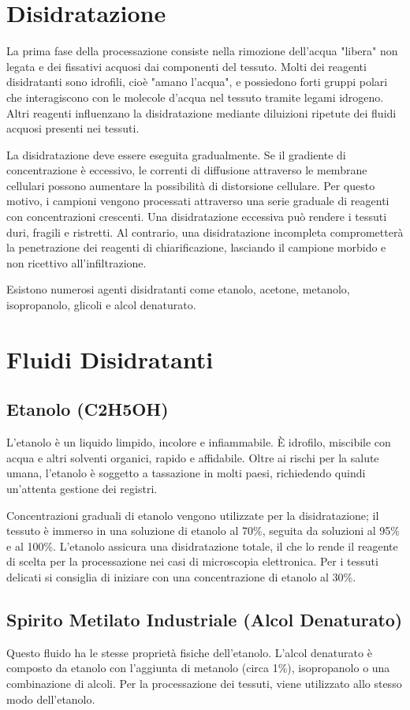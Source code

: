 \section{Disidratazione}
La prima fase della processazione consiste nella rimozione dell'acqua "libera" non legata e dei fissativi acquosi dai componenti del tessuto. Molti dei reagenti disidratanti sono idrofili, cioè "amano l'acqua", e possiedono forti gruppi polari che interagiscono con le molecole d'acqua nel tessuto tramite legami idrogeno. Altri reagenti influenzano la disidratazione mediante diluizioni ripetute dei fluidi acquosi presenti nei tessuti.

La disidratazione deve essere eseguita gradualmente. Se il gradiente di concentrazione è eccessivo, le correnti di diffusione attraverso le membrane cellulari possono aumentare la possibilità di distorsione cellulare. Per questo motivo, i campioni vengono processati attraverso una serie graduale di reagenti con concentrazioni crescenti. Una disidratazione eccessiva può rendere i tessuti duri, fragili e ristretti. Al contrario, una disidratazione incompleta comprometterà la penetrazione dei reagenti di chiarificazione, lasciando il campione morbido e non ricettivo all'infiltrazione.

Esistono numerosi agenti disidratanti come etanolo, acetone, metanolo, isopropanolo, glicoli e alcol denaturato.

\section{Fluidi Disidratanti}
\subsection{Etanolo (C2H5OH)}
L'etanolo è un liquido limpido, incolore e infiammabile. È idrofilo, miscibile con acqua e altri solventi organici, rapido e affidabile. Oltre ai rischi per la salute umana, l'etanolo è soggetto a tassazione in molti paesi, richiedendo quindi un'attenta gestione dei registri.

Concentrazioni graduali di etanolo vengono utilizzate per la disidratazione; il tessuto è immerso in una soluzione di etanolo al 70\%, seguita da soluzioni al 95\% e al 100\%. L'etanolo assicura una disidratazione totale, il che lo rende il reagente di scelta per la processazione nei casi di microscopia elettronica. Per i tessuti delicati si consiglia di iniziare con una concentrazione di etanolo al 30\%.

\subsection{Spirito Metilato Industriale (Alcol Denaturato)}
Questo fluido ha le stesse proprietà fisiche dell'etanolo. L'alcol denaturato è composto da etanolo con l'aggiunta di metanolo (circa 1\%), isopropanolo o una combinazione di alcoli. Per la processazione dei tessuti, viene utilizzato allo stesso modo dell'etanolo.

